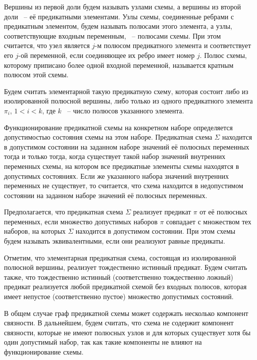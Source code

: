 \documentclass[12pt]{article}
\begin{document}
Вершины из первой доли будем называть узлами схемы, а вершины из второй доли ~-- её предикатными элементами. 
Узлы схемы, соединенные ребрами с предикатным элементом, будем называть полюсами этого элемента, 
а узлы, соответствующие входным переменным, ~-- полюсами схемы.
При этом считается, что узел является $j$-м полюсом предикатного элемента и соответствует 
его $j$-ой переменной, если соединяющее их ребро имеет номер $j$. Полюс схемы, которому приписано 
более одной входной переменной, называется кратным полюсом этой схемы. 

Будем считать элементарной такую предикатную схему, которая состоит либо из изолированной полюсной вершины, 
либо только из одного предикатного элемента $\pi_i$, $1 < i < k$, где $k$ ~-- число полюсов указанного элемента.

Функционирование предикатной схемы на конкретном наборе определяется допустимостью состояния схемы на этом наборе.
Предикатная схема $\Sigma$ находится в допустимом состоянии на 
заданном наборе значений её полюсных переменных тогда и только тогда, 
когда существует такой набор значений внутренних переменных схемы, на котором все предикатные элементы схемы находятся в допустимых состояниях. 
Если же указанного набора значений внутренних переменных не существует, то считается, что схема находится в недопустимом состоянии на 
заданном наборе значений её полюсных переменных.

Предполагается, что предикатная схема $\Sigma$ реализует предикат $\pi$ от её полюсных переменных, 
если множество допустимых наборов $\pi$ 
совпадает с множеством тех наборов, на которых $\Sigma$ находится в допустимом состоянии. 
При этом схемы будем называть эквивалентными, если они реализуют равные предикаты. 

Отметим, что элементарная предикатная схема, состоящая из изолированной полюсной вершины, 
реализует тождественно истинный предикат.
 Будем считать также, что тождественно истинный (соответственно тождественно ложный)
 предикат реализуется любой предикатной схемой без входных полюсов, 
которая имеет непустое (соответственно пустое) множество допустимых состояний.

В общем случае граф предикатной схемы может содержать несколько компонент связности. 
В дальнейшем, будем считать, что схема не содержит компонент связности,
которые не имеют полюсных узлов и для которых существует хотя бы один допустимый набор, 
так как такие компоненты не влияют на функционирование схемы.
\end{document}
